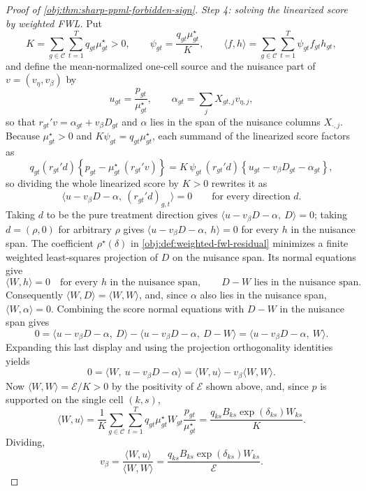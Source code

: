 \documentclass[11pt]{article}
\begin{document}
\begin{proof}[Proof of \cref{obj:thm:sharp-ppml-forbidden-sign}]
\textit{Step 4: solving the linearized score by weighted FWL.} Put
\[
K=\sum_{g\in\mathcal C}\sum_{t=1}^T q_{gt}\mu^\star_{gt}>0,
\qquad
\psi_{gt}=\frac{q_{gt}\mu^\star_{gt}}{K},
\qquad
\langle f,h\rangle=\sum_{g\in\mathcal C}\sum_{t=1}^T\psi_{gt}f_{gt}h_{gt},
\]
and define the mean-normalized one-cell source and the nuisance part of \(v=(v_\eta,v_\beta)\) by
\[
u_{gt}=\frac{p_{gt}}{\mu^\star_{gt}},
\qquad
\alpha_{gt}=\sum_jX_{gt,j}v_{\eta,j},
\]
so that \(r_{gt}'v=\alpha_{gt}+v_\beta D_{gt}\) and \(\alpha\) lies in the span of the nuisance columns \(X_{\cdot,j}\). Because \(\mu^\star_{gt}>0\) and \(K\psi_{gt}=q_{gt}\mu^\star_{gt}\), each summand of the linearized score factors as
\[
q_{gt}(r_{gt}'d)\left\{p_{gt}-\mu^\star_{gt}\,(r_{gt}'v)\right\}
=
K\,\psi_{gt}\,(r_{gt}'d)\left\{u_{gt}-v_\beta D_{gt}-\alpha_{gt}\right\},
\]
so dividing the whole linearized score by \(K>0\) rewrites it as
\[
\langle u-v_\beta D-\alpha,\ (r_{gt}'d)_{g,t}\rangle=0
\qquad\text{for every direction }d .
\]
Taking \(d\) to be the pure treatment direction gives \(\langle u-v_\beta D-\alpha,\ D\rangle=0\); taking \(d=(\rho,0)\) for arbitrary \(\rho\) gives \(\langle u-v_\beta D-\alpha,\ h\rangle=0\) for every \(h\) in the nuisance span.
The coefficient \(\rho^\star(\delta)\) in \cref{obj:def:weighted-fwl-residual} minimizes a finite weighted least-squares projection of \(D\) on the nuisance span. Its normal equations give
\[
\langle W,h\rangle=0\quad\text{for every }h\text{ in the nuisance span},
\qquad
D-W\text{ lies in the nuisance span}.
\]
Consequently \(\langle W,D\rangle=\langle W,W\rangle\), and, since \(\alpha\) also lies in the nuisance span, \(\langle W,\alpha\rangle=0\). Combining the score normal equations with \(D-W\) in the nuisance span gives
\[
0=\langle u-v_\beta D-\alpha,\ D\rangle
 -\langle u-v_\beta D-\alpha,\ D-W\rangle
=\langle u-v_\beta D-\alpha,\ W\rangle.
\]
Expanding this last display and using the projection orthogonality identities yields
\[
0=\langle W,\ u-v_\beta D-\alpha\rangle
=\langle W,u\rangle-v_\beta\langle W,W\rangle .
\]
Now \(\langle W,W\rangle=\mathcal E/K>0\) by the positivity of \(\mathcal E\) shown above, and, since \(p\) is supported on the single cell \((k,s)\),
\[
\langle W,u\rangle
=
\frac{1}{K}\sum_{g\in\mathcal C}\sum_{t=1}^T q_{gt}\mu^\star_{gt}W_{gt}\frac{p_{gt}}{\mu^\star_{gt}}
=
\frac{q_{ks}B_{ks}\exp(\delta_{ks})W_{ks}}{K}.
\]
Dividing,
\[
v_\beta=\frac{\langle W,u\rangle}{\langle W,W\rangle}
=\frac{q_{ks}B_{ks}\exp(\delta_{ks})W_{ks}}{\mathcal E}.
\]


\end{proof}
\end{document}
